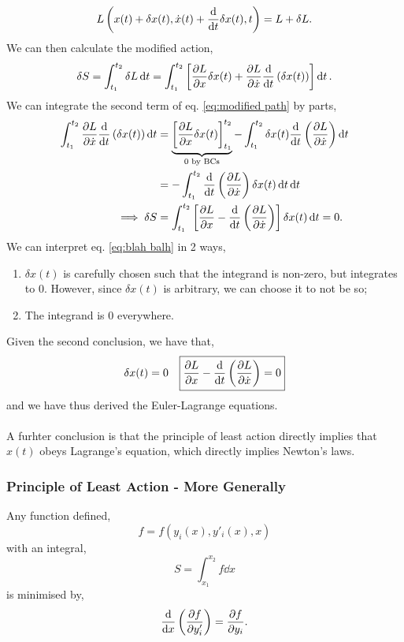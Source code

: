 \documentclass{book}
\begin{document}
\begin{equation}
	L\left(x(t) + \delta x(t), \Dot{x}(t) + \dv{t}\delta x(t), t\right) = L + \delta L.
\end{equation}
We can then calculate the modified action,
\begin{equation}
	\delta S = \int_{t_1}^{t_2} \delta L \dd{t} = \int_{t_1}^{t_2}\left[\pdv{L}{x}\delta x(t) + \pdv{L}{\Dot{x}}\dv{t}\left(\delta x(t)\right)\right]\dd{t}. \label{eq:modified path}
\end{equation}
We can integrate the second term of eq. \eqref{eq:modified path} by parts,
\begin{equation}
	\begin{split}
	\int_{t_1}^{t_2}\pdv{L}{\Dot{x}} \dv{t}\left(\delta x(t)\right)\dd{t}& = \underbrace{\left[\pdv{L}{x}\delta x(t)\right]_{t_1}^{t_2}}_{0 \text{ by BCs}} -\int_{t_1}^{t_2} \delta x(t) \dv{t}\left(\pdv{L}{\Dot{x}}\right)\dd{t} \\
	& = -\int_{t_1}^{t_2}\dv{t}\left(\pdv{L}{\Dot{x}}\right)\delta x(t)\dd{t} \dd{t} \\
	\implies \delta S & = \int_{t_1}^{t_2}\left[\pdv{L}{x} - \dv{t}\left(\pdv{L}{\Dot{x}}\right)\right]\delta x(t) \dd{t} = 0.
	\end{split} \label{eq:blah balh}
\end{equation}
We can interpret eq. \eqref{eq:blah balh} in 2 ways,
\begin{enumerate}
	\item $\delta x(t)$ is carefully chosen such that the integrand is non-zero, but integrates to 0. However, since $\delta x(t)$ is arbitrary, we can choose it to not be so;
	\item The integrand is 0 everywhere.
\end{enumerate}
Given the second conclusion, we have that,
\begin{align}
	\delta x(t) = 0 && \boxed{\pdv{L}{x} - \dv{t}\left(\pdv{L}{\Dot{x}}\right) = 0} \label{eq:euler lagrange}
\end{align}
and we have thus derived the Euler-Lagrange equations.
\\\\
A furhter conclusion is that the principle of least action directly implies that $x(t)$ obeys Lagrange's equation, which directly implies Newton's laws.
\subsubsection{Principle of Least Action - More Generally}
Any function defined,
\begin{equation}
	f = f(y_i(x), y'_i(x), x)
\end{equation}
with an integral,
\begin{equation}
	S = \int_{x_1}^{x_2}f\dd{x}
\end{equation}
is minimised by,
\begin{equation}
	\dv{x}\left(\pdv{f}{y_i'}\right) = \pdv{f}{y_i}. \label{eq:sols}
\end{equation}
\end{document}
